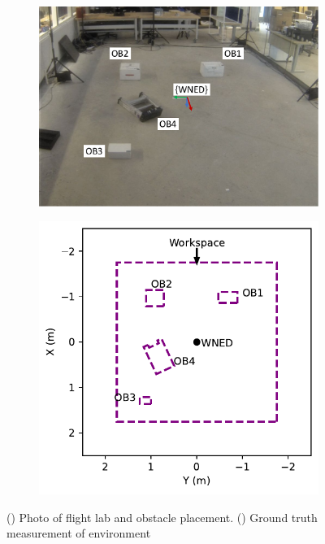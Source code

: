 \begin{figure}[!htb]
  \centering
  \begin{subfigure}[t]{.50\linewidth}
    \centering  \includegraphics[page=2,clip,trim=0cm 1cm 0cm 0cm,width=.99\linewidth]{chapter_7_experiments/imgs/ExperimentSetup.pdf}
    \caption{\label{fig:ch7_workspace_a}}
  \end{subfigure}
  \begin{subfigure}[t]{.35\linewidth}
    \centering\includegraphics[page=1,clip,trim=0cm 0cm 0cm 0cm,width=.99\linewidth]{chapter_7_experiments/imgs/workspace_plot.pdf}
    \caption{\label{fig:ch7_workspace_b}}
  \end{subfigure}

  \caption[Photo of flight lab and obstacle placement]{() Photo of flight lab and obstacle placement. () Ground truth measurement of environment}\label{fig:ch7_workspace}
\end{figure}

